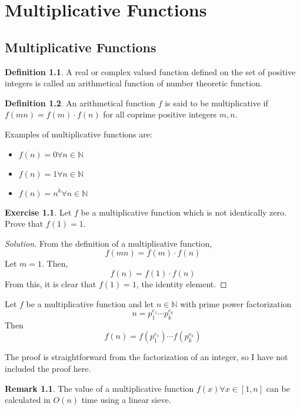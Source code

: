 \documentclass[12pt,letterpaper]{book}
\theoremstyle{definition}
\newtheorem{definition}{Definition} %
\newtheorem*{remark}{Remark}
\newtheorem*{exercise}{Exercise}
\newenvironment{solution}
  {\renewcommand\qedsymbol{$\blacksquare$}\begin{proof}[Solution]}
  {\end{proof}}
\newcommand{\N}{\mathbb{N}}
\begin{document}
\chapter{Multiplicative Functions}

\section{Multiplicative Functions}

\begin{definition}
  A real or complex valued function defined on the set of positive integers is called an arithmetical function of number theoretic function.
\end{definition}

\begin{definition}
  An arithmetical function $f$ is said to be multiplicative if $f(mn) = f(m) \cdot f(n)$ for all coprime positive integers $m,n$.
\end{definition}

Examples of multiplicative functions are:
\begin{itemize}
  \item $f(n) = 0 \forall n \in \N$
  \item $f(n) = 1 \forall n \in \N$
  \item $f(n) = n^k \forall n \in \N$
\end{itemize}

\begin{exercise}
  Let $f$ be a multiplicative function which is not identically zero. Prove that $f(1) = 1$.
\end{exercise}
\begin{solution}
 From the definition of a multiplicative function,
 \[f(mn) = f(m) \cdot f(n)\]
 Let $m = 1$. Then,
 \[f(n) = f(1) \cdot f(n)\]
 From this, it is clear that $f(1) = 1$, the identity element.
\end{solution}

\begin{theorem}
  Let $f$ be a multiplicative function and let $n \in \N$ with prime power factorization
  \[n = p_1^{e_1} \cdots p_k^{e_k}\]
  Then
  \[f(n) = f(p_1^{e_1}) \cdots f(p_k^{e_k})\]
\end{theorem}

The proof is straightforward from the factorization of an integer, so I have not included the proof here.

\begin{remark}
  The value of a multiplicative function $f(x) \forall x \in [1,n]$ can be calculated in $O(n)$ time using a linear sieve. 
\end{remark}
\end{document}
